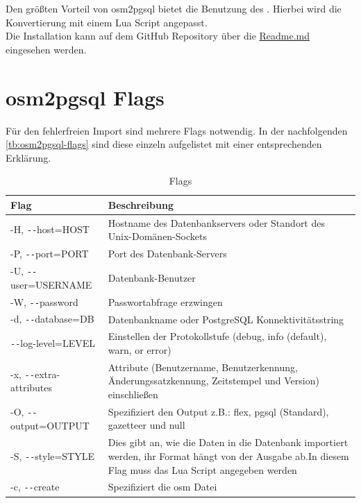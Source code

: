 Den größten Vorteil von osm2pgsql bietet die Benutzung des . Hierbei wird die Konvertierung mit einem Lua Script angepasst.\\

Die Installation kann auf dem GitHub Repository über die \href{https://github.com/OpenHistoricalDataMap/OHDMConverter/tree/SteSad#readme}{Readme.md} eingesehen werden.

\section{osm2pgsql Flags}
Für den fehlerfreien Import sind mehrere Flags notwendig. In der nachfolgenden \autoref{tb:osm2pgsql-flags} sind diese einzeln aufgelistet mit einer entsprechenden Erklärung.
\begin{table}[h]
	\caption{Flags}
	\label{tb:osm2pgsql-flags}
	\renewcommand{\arraystretch}{1.2}
	\begin{tabularx}{\linewidth}{|l|X|}\hline
		\textbf{Flag} & \textbf{Beschreibung}\\\hline
		-H, \texttt{-{}-}host=HOST & Hostname des Datenbankservers oder Standort des Unix-Domänen-Sockets\\\hline
		-P, \texttt{-{}-}port=PORT & Port des Datenbank-Servers\\\hline
		-U, \texttt{-{}-}user=USERNAME & Datenbank-Benutzer\\\hline
		-W, \texttt{-{}-}password & Passwortabfrage erzwingen\\\hline
		-d, \texttt{-{}-}database=DB & Datenbankname oder PostgreSQL Konnektivitätsstring\\\hline
		\texttt{-{}-}log-level=LEVEL & Einstellen der Protokollstufe (debug, info (default), warn, or error)\\\hline
		-x, \texttt{-{}-}extra-attributes & Attribute (Benutzername, Benutzerkennung, Änderungssatzkennung, Zeitstempel und Version) einschließen\\\hline
		-O, \texttt{-{}-}output=OUTPUT & Spezifiziert den Output z.B.: flex, pgsql (Standard), gazetteer und null\\\hline
		-S, \texttt{-{}-}style=STYLE &  Dies gibt an, wie die Daten in die Datenbank importiert werden, ihr Format hängt von der Ausgabe ab.\newline In diesem Flag muss das Lua Script angegeben werden\\\hline		
		-c, \texttt{-{}-}create & Spezifiziert die osm Datei\\\hline
	\end{tabularx}\vspace{0.5cm}
\end{table}

